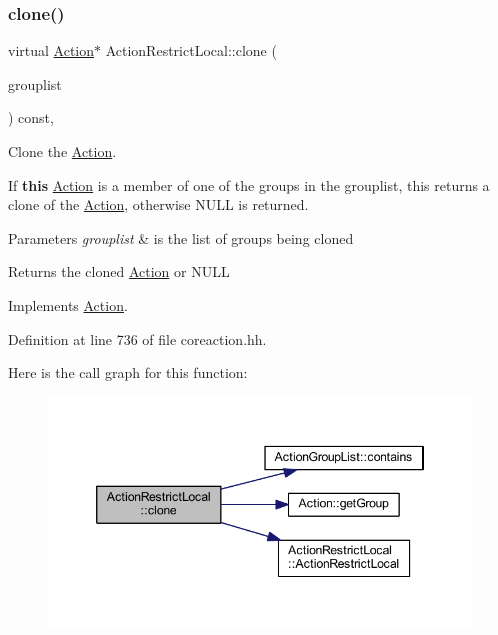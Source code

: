 \subsubsection{\texorpdfstring{clone()}{clone()}}
{\footnotesize\ttfamily virtual \mbox{\hyperlink{class_action}{Action}}$\ast$ Action\+Restrict\+Local\+::clone (\begin{DoxyParamCaption}\item[{const \mbox{\hyperlink{class_action_group_list}{Action\+Group\+List}} \&}]{grouplist }\end{DoxyParamCaption}) const\hspace{0.3cm}{\ttfamily [inline]}, {\ttfamily [virtual]}}



Clone the \mbox{\hyperlink{class_action}{Action}}. 

If {\bfseries{this}} \mbox{\hyperlink{class_action}{Action}} is a member of one of the groups in the grouplist, this returns a clone of the \mbox{\hyperlink{class_action}{Action}}, otherwise N\+U\+LL is returned. 
\begin{DoxyParams}{Parameters}
{\em grouplist} & is the list of groups being cloned \\
\hline
\end{DoxyParams}
\begin{DoxyReturn}{Returns}
the cloned \mbox{\hyperlink{class_action}{Action}} or N\+U\+LL 
\end{DoxyReturn}


Implements \mbox{\hyperlink{class_action_af8242e41d09e5df52f97df9e65cc626f}{Action}}.



Definition at line 736 of file coreaction.\+hh.

Here is the call graph for this function\+:
\nopagebreak
\begin{figure}[H]
\begin{center}
\leavevmode
\includegraphics[width=346pt]{class_action_restrict_local_a8e1551beb973dfdb3e8bede8903f9607_cgraph}
\end{center}
\end{figure}


